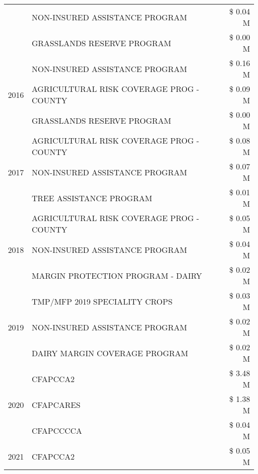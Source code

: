 \begin{tabular}{llr}
 & NON-INSURED ASSISTANCE PROGRAM & \$ 0.04 M \\
 & GRASSLANDS RESERVE PROGRAM & \$ 0.00 M \\
\cline{1-3}
\multirow[t]{3}{*}{2016} & NON-INSURED ASSISTANCE PROGRAM & \$ 0.16 M \\
 & AGRICULTURAL RISK COVERAGE PROG - COUNTY & \$ 0.09 M \\
 & GRASSLANDS RESERVE PROGRAM & \$ 0.00 M \\
\cline{1-3}
\multirow[t]{3}{*}{2017} & AGRICULTURAL RISK COVERAGE PROG - COUNTY & \$ 0.08 M \\
 & NON-INSURED ASSISTANCE PROGRAM & \$ 0.07 M \\
 & TREE ASSISTANCE PROGRAM & \$ 0.01 M \\
\cline{1-3}
\multirow[t]{3}{*}{2018} & AGRICULTURAL RISK COVERAGE PROG - COUNTY & \$ 0.05 M \\
 & NON-INSURED ASSISTANCE PROGRAM & \$ 0.04 M \\
 & MARGIN PROTECTION PROGRAM - DAIRY & \$ 0.02 M \\
\cline{1-3}
\multirow[t]{3}{*}{2019} & TMP/MFP 2019 SPECIALITY CROPS & \$ 0.03 M \\
 & NON-INSURED ASSISTANCE PROGRAM & \$ 0.02 M \\
 & DAIRY MARGIN COVERAGE PROGRAM & \$ 0.02 M \\
\cline{1-3}
\multirow[t]{3}{*}{2020} & CFAPCCA2 & \$ 3.48 M \\
 & CFAPCARES & \$ 1.38 M \\
 & CFAPCCCCA & \$ 0.04 M \\
\cline{1-3}
2021 & CFAPCCA2 & \$ 0.05 M \\
\cline{1-3}
\bottomrule
\end{tabular}
